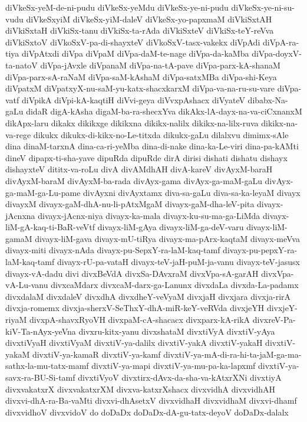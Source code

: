 {diVkeSx-yeM-de-ni-pudu
diVkeSx-yeMdu
diVkeSx-ye-ni-pudu
diVkeSx-ye-ni-su-vudu
diVkeSxyiM
diVkeSx-yiM-daleV
diVkeSx-yo-papxmaM
diVkiSxtAH
diVkiSxtaH
diVkiSx-tanu
diVkiSx-ta-rAda
diVkiSxteV
diVkiSx-teY-reVva
diVkiSxtoV
diVkoSxV-pa-di-shayxteV
diVkoSxV-tasx-vakekx
diVpAdi
diVpA-ra-tiya
diVpAtxdi
diVpa
diVpaM
diVpa-daM-te-nage
diVpa-da-kaMba
diVpa-doyxV-ta-natoV
diVpa-jAvxle
diVpanaM
diVpa-na-tA-pave
diVpa-parx-kA-shanaM
diVpa-parx-sA-raNaM
diVpa-saM-kAshaM
diVpa-satxMBa
diVpa-shi-Keya
diVpatxM
diVpatxyX-nu-saM-yu-katx-shacxkarxM
diVpa-va-na-ru-su-vare
diVpa-vatf
diVpikA
diVpi-kA-kaqtiH
diVvi-geya
diVvxpAshacx
diVyateV
dibabx-Na-gaLu
didaR
digA-kAsha
digaM-ba-ra-shecxYva
dikAkx-lA-dayx-na-va-ciCxnanxM
dikApx-laru
dikakx
dikikxge
dikikxna
dikikx-nalilx
dikikx-na-lilx-ruva
dikikx-na-va-rege
dikukx
dikukx-di-kikx-no-Le-titxda
dikukx-gaLu
dilalxvu
dimimx-sAle
dina
dinaM-tarxnA
dina-ca-ri-yeMba
dina-di-nake
dina-ka-Le-viri
dina-pa-kAMti
dineV
dipapx-ti-sha-yave
dipuRda
dipuRde
dirA
dirisi
dishati
dishatu
dishayx
dishayxteV
dititx-va-roLu
divA
divAMdhAH
divA-kareV
divAyxM-baraH
divAyxM-baraM
divAyxM-ba-rada
divAyx-gama
divAyx-ga-maM-gaLu
divAyx-ga-maM-ga-Lu-pame
divAyxni
divAyxtamx
diva-sa-gaLu
diva-sa-ka-leyaM
divayx
divayxM
divayx-gaM-dhA-nu-li-pAtxMgaM
divayx-gaM-dha-leV-pita
divayx-jAcnxna
divayx-jAcnx-niya
divayx-ka-mala
divayx-ku-su-ma-ga-LiMda
divayx-liM-gA-kaq-ti-BaR-veVtf
divayx-liM-gAya
divayx-liM-ga-deV-varu
divayx-liM-gamaM
divayx-liM-gava
divayx-mU-tiRya
divayx-ma-pArx-kaqtaM
divayx-meVva
divayx-miti
divayx-nAda
divayx-pu-SepxY-ra-laM-kaq-tamf
divayx-pu-pepxY-ra-laM-kaq-tamf
divayx-rU-pa-vataH
divayx-teV-jaH-puM-ja-vanu
divayx-teV-jasusx
divayx-vA-dadu
divi
divxBeVdA
divxSa-DAvxraM
divxVpa-sA-garAH
divxVpa-vA-Lu-vanu
divxcaMdarx
divxcaM-darx-ga-Lanunx
divxdaLa
divxda-La-padamx
divxdalaM
divxdaleV
divxdhA
divxdheY-veVyaM
divxjaH
divxjara
divxja-rirA
divxja-romemx
divxja-sherxV-SeThxY-dhA-miR-keY-veRVda
divxjeYH
divxjeY-riyaM
divxpA-shavxRyoVH
divxpaM-cA-shacacx
divxparx-kA-rikA
divxreV-Pa-kiV-Ta-nAyx-yeVna
divxru-kitx-yanu
divxshataM
divxtiVyA
divxtiV-yAya
divxtiVyaH
divxtiVyaM
divxtiV-ya-dalilx
divxtiV-yakA
divxtiV-yakaH
divxtiV-yakaM
divxtiV-ya-kamaR
divxtiV-ya-kamf
divxtiV-ya-mA-di-ra-hi-ta-jaM-ga-ma-sathx-la-mu-tatx-mamf
divxtiV-ya-mapi
divxtiV-ya-mu-pa-ka-lapxmf
divxtiV-ya-savx-ra-BU-Si-tamf
divxtiVyoV
divxtirx-dAvx-da-sha-va-kAtxrXNi
divxtiyA
divxvakatxrX
divxvakatxrXM
divxva-katxrXshacx
divxvidhA
divxvidhAH
divxvi-dhA-ra-Ba-vaMti
divxvi-dhAsetxV
divxvidhaH
divxvidhaM
divxvi-dhamf
divxvidhoV
divxvidoV
do
doDaDx
doDaDx-dA-gu-tatx-deyoV
doDaDx-dalalx
}
